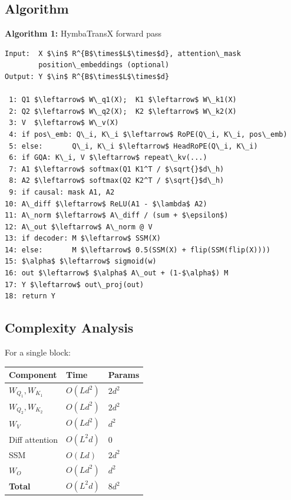\subsection{Algorithm}

\textbf{Algorithm 1:} HymbaTransX forward pass
\begin{lstlisting}
Input:  X $\in$ R^{B$\times$L$\times$d}, attention\_mask
        position\_embeddings (optional)
Output: Y $\in$ R^{B$\times$L$\times$d}

 1: Q1 $\leftarrow$ W\_q1(X);  K1 $\leftarrow$ W\_k1(X)
 2: Q2 $\leftarrow$ W\_q2(X);  K2 $\leftarrow$ W\_k2(X)
 3: V  $\leftarrow$ W\_v(X)
 4: if pos\_emb: Q\_i, K\_i $\leftarrow$ RoPE(Q\_i, K\_i, pos\_emb)
 5: else:       Q\_i, K\_i $\leftarrow$ HeadRoPE(Q\_i, K\_i)
 6: if GQA: K\_i, V $\leftarrow$ repeat\_kv(...)
 7: A1 $\leftarrow$ softmax(Q1 K1^T / $\sqrt{}$d\_h)
 8: A2 $\leftarrow$ softmax(Q2 K2^T / $\sqrt{}$d\_h)
 9: if causal: mask A1, A2
10: A\_diff $\leftarrow$ ReLU(A1 - $\lambda$ A2)
11: A\_norm $\leftarrow$ A\_diff / (sum + $\epsilon$)
12: A\_out $\leftarrow$ A\_norm @ V
13: if decoder: M $\leftarrow$ SSM(X)
14: else:       M $\leftarrow$ 0.5(SSM(X) + flip(SSM(flip(X))))
15: $\alpha$ $\leftarrow$ sigmoid(w)
16: out $\leftarrow$ $\alpha$ A\_out + (1-$\alpha$) M
17: Y $\leftarrow$ out\_proj(out)
18: return Y
\end{lstlisting}

\subsection{Complexity Analysis}

For a single block:

\begin{table}[H]
\centering
\small
\begin{tabular}{lll}
\toprule
\textbf{Component} & \textbf{Time} & \textbf{Params} \\
\midrule
$W_{Q_1}, W_{K_1}$ & $O(L d^2)$ & $2 d^2$ \\
$W_{Q_2}, W_{K_2}$ & $O(L d^2)$ & $2 d^2$ \\
$W_V$ & $O(L d^2)$ & $d^2$ \\
Diff attention & $O(L^2 d)$ & 0 \\
SSM & $O(L d)$ & $2 d^2$ \\
$W_O$ & $O(L d^2)$ & $d^2$ \\
\textbf{Total} & $O(L^2 d)$ & $8 d^2$ \\
\bottomrule
\end{tabular}
\end{table}

